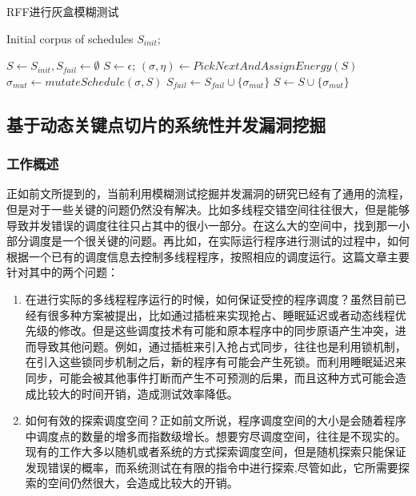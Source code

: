 \begin{algorithm}[!ht]
\caption{RFF进行灰盒模糊测试}
\label{power}
\begin{algorithmic}[1]
    \REQUIRE  Initial corpus of schedules $S_{init}$; %
    
    \STATE $S \leftarrow S_{init}, S_{fail} \leftarrow \emptyset$
     \STATE $S \leftarrow {\epsilon}$;
    \ENDIF
    \REPEAT
        \STATE $(\sigma, \eta) \leftarrow PickNextAndAssignEnergy(S)$
            \STATE $\sigma_{mut} \leftarrow mutateSchedule(\sigma, S)$
             \STATE $S_{fail} \leftarrow S_{fail} \cup \{\sigma_{mut}\}$
            \ENDIF
             \STATE $S \leftarrow S \cup \{\sigma_{mut}\}$
            \ENDIF
        \ENDFOR
\end{algorithmic}  
\end{algorithm}



\subsection{基于动态关键点切片的系统性并发漏洞挖掘}

\subsubsection{工作概述}

正如前文所提到的，当前利用模糊测试挖掘并发漏洞的研究已经有了通用的流程，但是对于一些关键的问题仍然没有解决。比如多线程交错空间往往很大，但是能够导致并发错误的调度往往只占其中的很小一部分。在这么大的空间中，找到那一小部分调度是一个很关键的问题。再比如，在实际运行程序进行测试的过程中，如何根据一个已有的调度信息去控制多线程程序，按照相应的调度运行。这篇文章主要针对其中的两个问题：

\begin{enumerate}
\item 在进行实际的多线程程序运行的时候，如何保证受控的程序调度？虽然目前已经有很多种方案被提出，比如通过插桩来实现抢占、睡眠延迟或者动态线程优先级的修改。但是这些调度技术有可能和原本程序中的同步原语产生冲突，进而导致其他问题。例如，通过插桩来引入抢占式同步，往往也是利用锁机制，在引入这些锁同步机制之后，新的程序有可能会产生死锁。而利用睡眠延迟来同步，可能会被其他事件打断而产生不可预测的后果，而且这种方式可能会造成比较大的时间开销，造成测试效率降低。
\item 如何有效的探索调度空间？正如前文所说，程序调度空间的大小是会随着程序中调度点的数量的增多而指数级增长。想要穷尽调度空间，往往是不现实的。现有的工作大多以随机或者系统的方式探索调度空间，但是随机探索只能保证发现错误的概率，而系统测试在有限的指令中进行探索,尽管如此，它所需要探索的空间仍然很大，会造成比较大的开销。
\end{enumerate}

